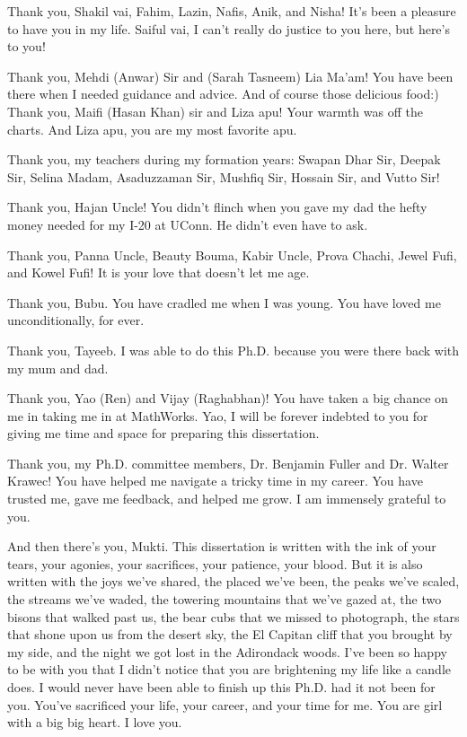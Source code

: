   Thank you, Shakil vai, Fahim, Lazin, Nafis, Anik, and Nisha! 
  It's been a pleasure to have you in my life. 
  Saiful vai, I can't really do justice to you here, but here's to you!

  Thank you, Mehdi (Anwar) Sir and (Sarah Tasneem) Lia Ma'am! 
  You have been there when I needed guidance and advice. 
  And of course those delicious food:)
  Thank you, Maifi (Hasan Khan) sir and Liza apu! 
  Your warmth was off the charts. 
  And Liza apu, you are my most favorite apu.

  Thank you, my teachers during my formation years: 
  Swapan Dhar Sir, Deepak Sir, Selina Madam, Asaduzzaman Sir, Mushfiq Sir, Hossain Sir, and Vutto Sir! 

  Thank you, Hajan Uncle! You didn't flinch when you gave my dad the hefty money 
  needed for my I-20 at UConn. He didn't even have to ask.

  Thank you, Panna Uncle, Beauty Bouma, Kabir Uncle, Prova Chachi, Jewel Fufi, and Kowel Fufi! 
  It is your love that doesn't let me age.

  Thank you, Bubu. You have cradled me when I was young. 
  You have loved me unconditionally, for ever.

  Thank you, Tayeeb. I was able to do this Ph.D. because you were there back with my mum and dad.

  \AckBreak
  Thank you, Yao (Ren) and Vijay (Raghabhan)! 
  You have taken a big chance on me in taking me in at MathWorks. 
  Yao, I will be forever indebted to you for 
  giving me time and space 
  for preparing this dissertation.

  \AckBreak
  Thank you, my Ph.D. committee members, Dr. Benjamin Fuller and Dr. Walter Krawec! 
  You have helped me navigate a tricky time in my career. 
  You have trusted me, gave me feedback, and helped me grow. 
  I am immensely grateful to you.

  \AckBreak
  And then there's you, Mukti. 
  This dissertation is written with the ink of your tears, 
  your agonies, your sacrifices, your patience, your blood. 
  But it is also written with the joys we've shared, 
  the placed we've been, 
  the peaks we've scaled, 
  the streams we've waded, 
  the towering mountains that we've gazed at, 
  the two bisons that walked past us, 
  the bear cubs that we missed to photograph, 
  the stars that shone upon us from the desert sky, 
  the El Capitan cliff that you brought by my side, 
  and the night we got lost in the Adirondack woods.
  I've been so happy to be with you 
  that I didn't notice that you are brightening my life 
  like a candle does. 
  I would never have been able to finish up this Ph.D. had it not been for you. 
  You've sacrificed your life, your career, and your time for me. 
  You are girl with a big big heart. 
  I love you.
  

